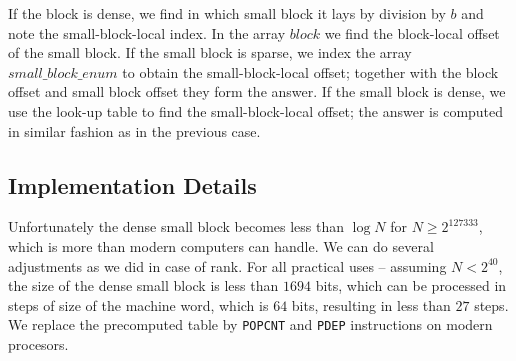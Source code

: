 If the block is dense, we find in which small block it lays by division by $b$ and note the small-block-local index.
In the array $block$ we find the block-local offset of the small block.
If the small block is sparse, we index the array $small\_block\_enum$ to obtain the small-block-local offset; together with the block offset and small block offset they form the answer.
If the small block is dense, we use the look-up table to find the small-block-local offset; the answer is computed in similar fashion as in the previous case.

\subsection{Implementation Details}


Unfortunately the dense small block becomes less than $\log N $ for $N \ge 2^{127333}$, which is more than modern computers can handle.
We can do several adjustments as we did in case of rank.
For all practical uses -- assuming $N < 2^{40}$, the size of the dense small block is less than $1694$ bits, which can be processed in steps of size of the machine word, which is $64$ bits, resulting in less than $27$ steps.
We replace the precomputed table by \verb|POPCNT| and \verb|PDEP| instructions on modern procesors.